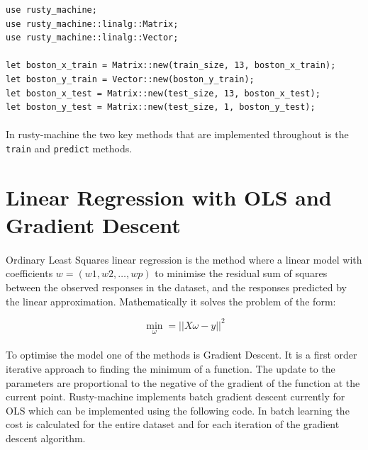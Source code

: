 \documentclass{book}
\begin{document}
\begin{lstlisting}[caption={chapter2\\/rustlymachine\_regression\\/src\\/lin\_reg\\.rs}]
use rusty_machine;
use rusty_machine::linalg::Matrix;
use rusty_machine::linalg::Vector;

let boston_x_train = Matrix::new(train_size, 13, boston_x_train);
let boston_y_train = Vector::new(boston_y_train);
let boston_x_test = Matrix::new(test_size, 13, boston_x_test);
let boston_y_test = Matrix::new(test_size, 1, boston_y_test);
\end{lstlisting}

\paragraph{}%
In rusty-machine the two key methods that are implemented throughout is the \lstinline{train} and \lstinline{predict} methods.
\label{par:}

\label{sub:rusty_machine_library}

\section{Linear Regression with OLS and Gradient Descent}%

\paragraph{}%
Ordinary Least Squares linear regression is the method where a linear model with coefficients $w = (w1, w2, \dots, wp)$ to minimise the residual sum of squares between the observed responses in the dataset, and the responses predicted by the linear approximation. Mathematically it solves the problem of the form:
\label{par:}

\begin{equation}
	\underset{\omega}{\min} = || X\omega - y ||^2
\end{equation}

\paragraph{}%
To optimise the model one of the methods is Gradient Descent. It is a first order iterative approach to finding the minimum of a function. The update to the parameters are proportional to the negative of the gradient of the function at the current point. Rusty-machine implements batch gradient descent currently for OLS which can be implemented using the following code. In batch learning the cost is calculated for the entire dataset and for each iteration of the gradient descent algorithm.
\label{par:}
\end{document}
